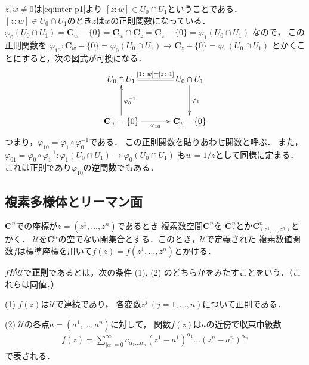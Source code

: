 \documentclass[11pt, a4paper, dvipdfmx, draft]{jsarticle}
\theoremstyle{definition}
\newcommand{\cc}{\mathbf{C}}
\newcommand{\mcal}{\mathcal}
\newcommand{\pphi}{\varphi} %
\newcommand{\UU}{\mcal{U}}
\theoremstyle{mystyle}
\numberwithin{equation}{section} %
\begin{document}
$z,w\ne 0$は\eqref{eq:inter-p1}より
$[z\colon w]\in U_0\cap U_1$ということである．
$[z\colon w]\in U_0\cap U_1$のとき$z$は$w$の正則関数になっている．
$\pphi_0 (U_0\cap U_1) = \cc_w-\{0\} 
= \cc_w \cap \cc_z 
= \cc_z-\{0\} 
= \pphi_1 (U_0\cap U_1)$
なので，
この正則関数を
$\pphi_{10}\colon \cc_w-\{0\}=\pphi_0 (U_0\cap U_1) 
\to \cc_z-\{0\} = \pphi_1 (U_0\cap U_1)$
とかくことにすると，次の図式が可換になる．
\begin{equation*}
    \vcenter{\xymatrix@C=35pt@R=35pt{
    {U_0\cap U_1} 
        \ar@{<-{}}[d]^{\pphi_0^{-1}} 
        \ar@{{}=}[r]^-{[1\colon w]=[z\colon 1]}
    & {U_0 \cap U_1} 
        \\
    \cc_w -\{0\}
        \ar[r]_{\pphi_{10}}
    & \cc_z -\{0\}
        \ar@{<-{}}[u]_{\pphi_1}
    }}
\end{equation*}
つまり，$\pphi_{10} = \pphi_1\circ \pphi_0^{-1}$である．
この正則関数を貼りあわせ関数と呼ぶ．
また，$\pphi_{01} = \pphi_0\circ \pphi_1^{-1}\colon \pphi_1 (U_0\cap U_1) \to \pphi_0 (U_0\cap U_1)$
も$w=1/z$として同様に定まる．これは正則であり$\pphi_{10}$の逆関数でもある．

\subsection{複素多様体とリーマン面}

$\cc^{n}$での座標が$z=(z^{1},\dots,z^{n})$であるとき
複素数空間$\cc^{n}$を
$\cc^{n}_{z}$とか$\cc^{n}_{(z^{1},\dots,z^{n})}$とかく．
$\UU$を$\cc^n$の空でない開集合とする．このとき，$\UU$で定義された
複素数値関数$f$は標準座標を用いて$f(z)=f(z^{1},\dots,z^{n})$とかける．

$f$が$\UU$で\textbf{正則}であるとは，次の条件 (1), (2) のどちらかをみたすことをいう．（これらは同値．）

(1) 
$f(z)$は$\UU$で連続であり，
各変数$z^{j}\ (j=1,\dots,n)$について正則である．

(2) 
$\UU$の各点$a=(a^1,\dots,a^n)$に対して，
関数$f(z)$は$a$の近傍で収束巾級数
\begin{align*}
    f(z)=\sum_{|\alpha|=0}^{\infty}c_{\alpha_1\dots\alpha_n}(z^1-a^1)^{\alpha_1}\dots(z^n-a^n)^{\alpha_n}
\end{align*}
で表される．
\end{document}
